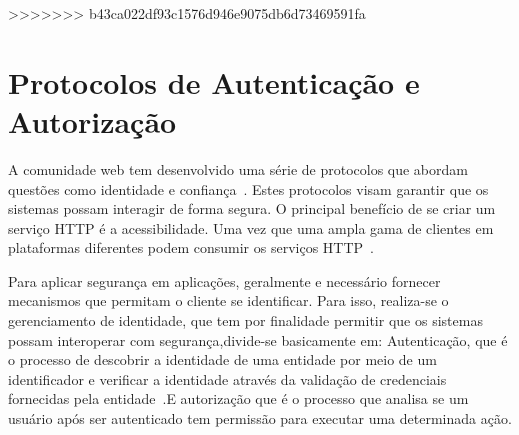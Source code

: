 
>>>>>>> b43ca022df93c1576d946e9075db6d73469591fa

\section{Protocolos de Autenticação e Autorização}
A comunidade web tem desenvolvido uma série de protocolos que abordam questões como identidade e confiança~\cite{Webber10}. Estes protocolos visam garantir que os sistemas possam interagir de forma segura. O principal benefício de se criar um serviço HTTP é a acessibilidade. Uma vez que uma ampla gama de clientes em plataformas diferentes podem consumir os serviços HTTP~\cite{lakshmiraghavan2013pro}.

Para aplicar segurança em aplicações, geralmente e necessário fornecer mecanismos que permitam o cliente se identificar. Para isso, realiza-se o gerenciamento de identidade, que tem por finalidade permitir que os sistemas possam interoperar com segurança,divide-se basicamente em: Autenticação, que é o processo de descobrir a identidade de uma entidade por meio de um identificador e verificar a identidade através da validação de credenciais fornecidas pela entidade~\cite{lakshmiraghavan2013pro}.E autorização que é o processo que analisa se um usuário após ser autenticado tem permissão para executar uma determinada ação.%


